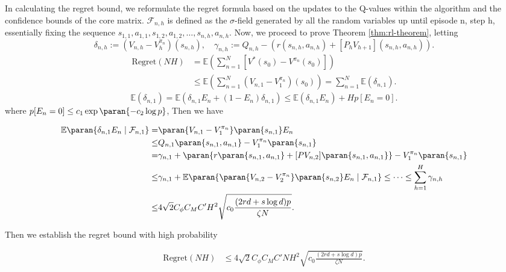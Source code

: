 In calculating the regret bound, we reformulate the regret formula based on the updates to the Q-values within the algorithm and the confidence bounds of the core matrix. $\mathcal{F}_{n,h}$ is defined as the $\sigma$-field generated by all the random variables up until episode n, step h, essentially fixing the sequence $s_{1,1}, a_{1,1}, s_{1,2}, a_{1,2}, \ldots, s_{n,h}, a_{n,h}$. 
Now, we proceed to prove Theorem \ref{thm:rl-theorem}, letting 
$$\delta_{n,h} := (V_{n,h}-V_{h}^{\pi_{n}})(s_{n,h}), \quad
\gamma_{n,h} := Q_{n,h} - \left(r(s_{n,h},a_{n,h}) + [P_h V_{h+1}](s_{n,h},a_{n,h})\right).$$
\begin{align*}
\text{Regret}(NH) &= \mathbb{E}\left(\sum_{n=1}^{N} \left[ V^*(s_0) - V^{\pi_n}(s_0) \right]\right) \\
&\leq \mathbb{E}\left( \sum_{n=1}^{N}(V_{n,1}-V_{1}^{\pi_{n}})(s_0)\right) = \sum_{n=1}^{N}\mathbb{E}(\delta_{n,1}).
\end{align*}
$$\mathbb{E}(\delta_{n,1}) = \mathbb{E}(\delta_{n,1}E_n+(1-E_n)\delta_{n,1}) 
\leq \mathbb{E}(\delta_{n,1}E_n)+Hp[E_n=0].$$
where $p[E_n=0]\leq c_1\exp\paran{-c_2\log p}$, Then we have

\begin{align*}
\mathbb{E}\paran{\delta_{n,1}E_n \mid \mathcal{F}_{n,1}} =& \paran{V_{n,1} - V_{1}^{\pi_{n}}}\paran{s_{n,1}}E_n \\
\leq &Q_{n,1}\paran{s_{n,1},a_{n,1}} - V_{1}^{\pi_{n}}\paran{s_{n,1}} \\
= &\gamma_{n,1} + \paran{r\paran{s_{n,1},a_{n,1}} +[PV_{n,2}]\paran{s_{n,1},a_{n,1}}} -V_{1}^{\pi_{n}}\paran{s_{n,1}} \\
\leq &\gamma_{n,1} + \mathbb{E}\paran{\paran{V_{n,2} - V_{2}^{\pi_{n}}}\paran{s_{n,2}}E_n \mid \mathcal{F}_{n,1}} 
\leq \cdots \leq \sum_{h=1}^{H}\gamma_{n,h}\\
\leq &4\sqrt{2}C_{\phi}C_{M}C' H^2\sqrt{c_0\frac{(2rd+s\log d)p}{\zeta N}}.
\end{align*}

Then we establish the regret bound with high probability

\begin{align*}
\text{Regret}(NH) &\leq 4\sqrt{2}C_{\phi}C_{M}C'NH^2\sqrt{c_0\frac{(2rd+s\log d)p}{\zeta N}}.
\end{align*}
